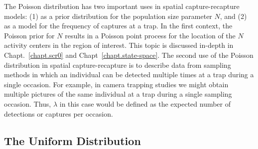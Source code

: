 The Poisson distribution has two important uses in spatial
capture-recapture models: (1) as a prior distribution for the
population size parameter $N$, and (2) as a model for the frequency of
captures at a trap. In the first context, the Poisson prior for $N$
results in a Poisson point process for the location of the $N$
activity centers in the region of interest. This topic is discussed
in-depth in Chapt.~\ref{chapt.scr0} and Chapt~\ref{chapt.state-space}.
The second use of the Poisson distribution in spatial capture-recapture is
to describe data from sampling methods in which an
individual can be detected multiple times at a trap during a single
occasion. For example, in camera trapping studies we might obtain
multiple pictures of the same individual at a trap during a single sampling
occasion. Thus, $\lambda$ in this case would be defined as the
expected number of detections or captures per occasion.


\subsection{The Uniform Distribution}

